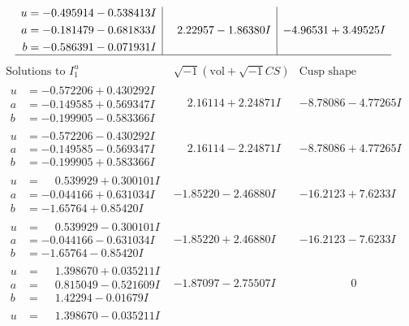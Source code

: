 \documentclass[1p]{elsarticle_modified}
\theoremstyle{definition}
\newcommand{\I}{\sqrt{-1}}
\begin{document}
$$\begin{array}{c|c|c}
\begin{aligned}
u &= -0.495914 - 0.538413 I \\
a &= -0.181479 - 0.681833 I \\
b &= -0.586391 - 0.071931 I\end{aligned}
 & \phantom{-}2.22957 - 1.86380 I & -4.96531 + 3.49525 I\\
 \hline 
 \end{array}$$\newpage$$\begin{array}{c|c|c}  
\text{Solutions to }I^u_{1}& \I (\text{vol} + \sqrt{-1}CS) & \text{Cusp shape}\\
 \hline 
\begin{aligned}
u &= -0.572206 + 0.430292 I \\
a &= -0.149585 + 0.569347 I \\
b &= -0.199905 - 0.583366 I\end{aligned}
 & \phantom{-}2.16114 + 2.24871 I & -8.78086 - 4.77265 I \\ \hline\begin{aligned}
u &= -0.572206 - 0.430292 I \\
a &= -0.149585 - 0.569347 I \\
b &= -0.199905 + 0.583366 I\end{aligned}
 & \phantom{-}2.16114 - 2.24871 I & -8.78086 + 4.77265 I \\ \hline\begin{aligned}
u &= \phantom{-}0.539929 + 0.300101 I \\
a &= -0.044166 + 0.631034 I \\
b &= -1.65764 + 0.85420 I\end{aligned}
 & -1.85220 - 2.46880 I & -16.2123 + 7.6233 I \\ \hline\begin{aligned}
u &= \phantom{-}0.539929 - 0.300101 I \\
a &= -0.044166 - 0.631034 I \\
b &= -1.65764 - 0.85420 I\end{aligned}
 & -1.85220 + 2.46880 I & -16.2123 - 7.6233 I \\ \hline\begin{aligned}
u &= \phantom{-}1.398670 + 0.035211 I \\
a &= \phantom{-}0.815049 - 0.521609 I \\
b &= \phantom{-}1.42294 - 0.01679 I\end{aligned}
 & -1.87097 - 2.75507 I & \phantom{-0.000000 } 0 \\ \hline\begin{aligned}
u &= \phantom{-}1.398670 - 0.035211 I \\

\end{aligned}
\end{array}$$
\end{document}
